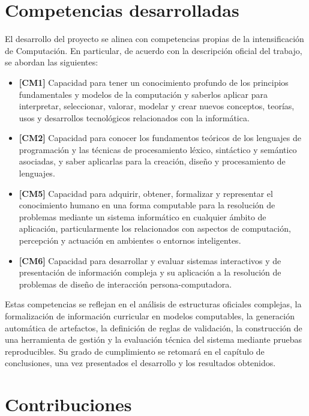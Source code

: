 \section{Competencias desarrolladas}
\label{sec:introduccion_competencias}

El desarrollo del proyecto se alinea con competencias propias de la
intensificación de Computación. En particular, de acuerdo con la descripción
oficial del trabajo, se abordan las siguientes:

\begin{itemize}
  \item \textbf{[CM1]} Capacidad para tener un conocimiento profundo de los
  principios fundamentales y modelos de la computación y saberlos aplicar para
  interpretar, seleccionar, valorar, modelar y crear nuevos conceptos, teorías,
  usos y desarrollos tecnológicos relacionados con la informática.

  \item \textbf{[CM2]} Capacidad para conocer los fundamentos teóricos de los
  lenguajes de programación y las técnicas de procesamiento léxico, sintáctico y
  semántico asociadas, y saber aplicarlas para la creación, diseño y procesamiento
  de lenguajes.

  \item \textbf{[CM5]} Capacidad para adquirir, obtener, formalizar y representar
  el conocimiento humano en una forma computable para la resolución de problemas
  mediante un sistema informático en cualquier ámbito de aplicación,
  particularmente los relacionados con aspectos de computación, percepción y
  actuación en ambientes o entornos inteligentes.

  \item \textbf{[CM6]} Capacidad para desarrollar y evaluar sistemas interactivos
  y de presentación de información compleja y su aplicación a la resolución de
  problemas de diseño de interacción persona-computadora.
\end{itemize}

Estas competencias se reflejan en el análisis de estructuras oficiales complejas,
la formalización de información curricular en modelos computables, la generación
automática de artefactos, la definición de reglas de validación, la construcción
de una herramienta de gestión y la evaluación técnica del sistema mediante pruebas
reproducibles. Su grado de cumplimiento se retomará en el capítulo de
conclusiones, una vez presentados el desarrollo y los resultados obtenidos.

\section{Contribuciones}
\label{sec:introduccion_contribuciones}

